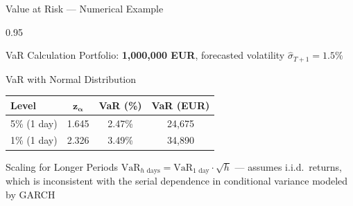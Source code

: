 \documentclass[9pt, aspectratio=169, t]{beamer}
\begin{document}
\begin{frame}{Value at Risk --- Numerical Example}
    \begin{cminipage}{0.95\textwidth}
    \small
    \begin{exampleblock}{VaR Calculation}
        Portfolio: \textbf{1,000,000 EUR}, forecasted volatility $\hat{\sigma}_{T+1} = 1.5\%$
    \end{exampleblock}

    \begin{block}{VaR with Normal Distribution}
        \begin{center}
            \small
            \begin{tabular}{lccc}
                \toprule
                \textbf{Level} & $\bm{z_\alpha}$ & \textbf{VaR (\%)} & \textbf{VaR (EUR)} \\
                \midrule
                5\% (1 day) & 1.645 & 2.47\% & 24,675 \\
                1\% (1 day) & 2.326 & 3.49\% & 34,890 \\
                \bottomrule
            \end{tabular}
        \end{center}
    \end{block}

    \begin{alertblock}{Scaling for Longer Periods}
        $\text{VaR}_{h\text{ days}} = \text{VaR}_{1\text{ day}} \cdot \sqrt{h}$ --- assumes i.i.d.\ returns, which is inconsistent with the serial dependence in conditional variance modeled by GARCH
    \end{alertblock}
    \end{cminipage}
\end{frame}
\end{document}
